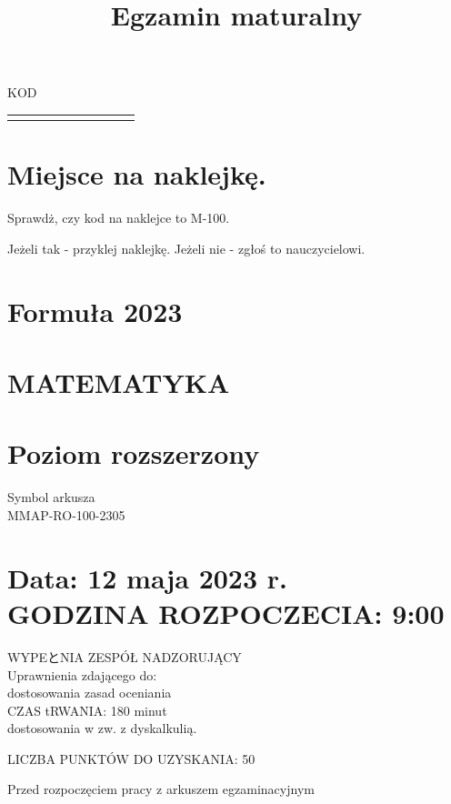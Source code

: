 \documentclass[10pt]{article}
\title{Egzamin maturalny }
\author{}
\date{}
\begin{document}
\maketitle
KOD

\begin{center}
\begin{tabular}{|l|l|l|l|l|l|l|l|l|l|}
\hline
 &  &  \\
\hline
 &  &  \\
\hline
\end{tabular}
\end{center}

\section*{Miejsce na naklejkę.}
Sprawdż, czy kod na naklejce to M-100.

Jeżeli tak - przyklej naklejkę. Jeżeli nie - zgłoś to nauczycielowi.

\section*{Formuła 2023}
\section*{MATEMATYKA}
\section*{Poziom rozszerzony}
Symbol arkusza\\
MMAP-RO-100-2305

\section*{Data: 12 maja 2023 r. \\
 GODZINA ROZPOCZECIA: 9:00}
WYPEとNIA ZESPÓŁ NADZORUJĄCY\\
Uprawnienia zdającego do:\\
dostosowania zasad oceniania\\
CZAS tRWANIA: 180 minut\\
dostosowania w zw. z dyskalkulią.

LICZBA PUNKTÓW DO UZYSKANIA: 50

Przed rozpoczęciem pracy z arkuszem egzaminacyjnym
\end{document}
